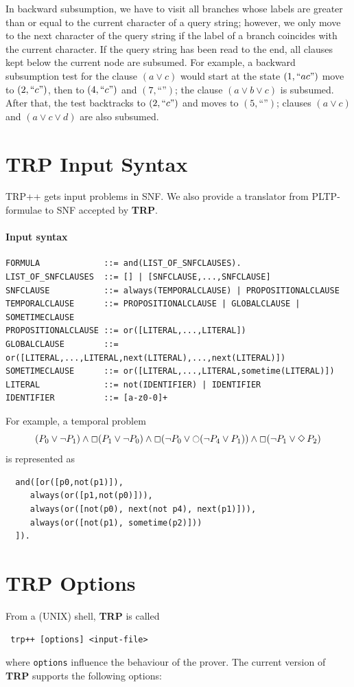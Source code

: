 \documentclass[11pt]{article}
\newcommand{\Next}[0]{\mathop{\ocircle}}
\newcommand{\Always}[0]{\mathop{\Box}}
\def\Sometime{\mathop{\Diamond}}
\newcommand{\TRPpp}{\textbf{TRP\protect\raisebox{0.4ex}{\scriptsize{+}{+}}}\xspace}
\begin{document}
In backward subsumption, we have to visit all branches whose labels
are greater than or equal to the current character of a query string; however,
we only move to the next character of the query string if the label of 
a branch coincides with the current character. If the query string
has been read to the end, all clauses kept below the current node are 
subsumed.
For example, a backward subsumption test for the clause $(a\lor c)$ would start
at the state $(1, ``ac\text{''})$ move to $(2, ``c\text{''})$, then to 
$(4, ``c\text{''})$ and
$(7, \text{``''})$; the clause $(a \lor b \lor c)$ is subsumed. After
that, the  
test backtracks to $(2, ``c\text{''})$ and moves to $(5, \text{``''})$; clauses
$(a \lor c)$ and $(a \lor c \lor d)$ are also subsumed.

\section{\TRPpp Input Syntax}
TRP++ gets input problems in SNF. We also provide a translator from
PLTP-formulae to SNF accepted by \TRPpp.

\paragraph{Input syntax}
\begin{verbatim}
FORMULA             ::= and(LIST_OF_SNFCLAUSES).
LIST_OF_SNFCLAUSES  ::= [] | [SNFCLAUSE,...,SNFCLAUSE]
SNFCLAUSE           ::= always(TEMPORALCLAUSE) | PROPOSITIONALCLAUSE
TEMPORALCLAUSE      ::= PROPOSITIONALCLAUSE | GLOBALCLAUSE | SOMETIMECLAUSE
PROPOSITIONALCLAUSE ::= or([LITERAL,...,LITERAL])
GLOBALCLAUSE        ::= or([LITERAL,...,LITERAL,next(LITERAL),...,next(LITERAL)])
SOMETIMECLAUSE      ::= or([LITERAL,...,LITERAL,sometime(LITERAL)])
LITERAL             ::= not(IDENTIFIER) | IDENTIFIER
IDENTIFIER          ::= [a-z0-0]+
\end{verbatim}

For example, a temporal problem
$$
(P_0\lor\lnot P_1)\land\Always(P_1\lor\lnot P_0) \land \Always(\lnot P_0\lor
\Next(\lnot P_4\lor P_1)) \land \Always(\lnot P_1\lor\Sometime P_2)
$$
is represented as
\begin{verbatim}
  and([or([p0,not(p1)]),
     always(or([p1,not(p0)])),
     always(or([not(p0), next(not p4), next(p1)])),
     always(or([not(p1), sometime(p2)]))
  ]).
\end{verbatim}
\section{\TRPpp Options}
From a (UNIX) shell, \TRPpp is called 
\begin{center}
\texttt{
trp++ [options] <input-file>
}
\end{center}
where \texttt{options} influence the behaviour of the prover. The current
version of \TRPpp supports the following options:
\end{document}
